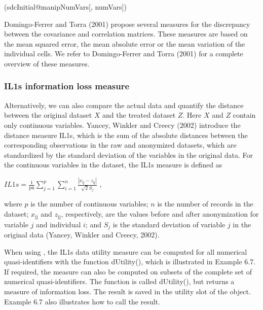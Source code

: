 \documentclass[letterpaper,10pt,english]{sphinxmanual}
\begin{document}
(sdcInitial@manipNumVars{[}, numVars{]})

\begin{DUlineblock}{0em}
\item[] 
\item[] 
\item[] 
\item[] 
\end{DUlineblock}

Domingo-Ferrer and Torra (2001) propose several measures for the
discrepancy between the covariance and correlation matrices. These
measures are based on the mean squared error, the mean absolute error or
the mean variation of the individual cells. We refer to Domingo-Ferrer
and Torra (2001) for a complete overview of these measures.


\subsubsection{IL1s information loss measure}
\label{\detokenize{utility:il1s-information-loss-measure}}
Alternatively, we can also compare the actual data and quantify the
distance between the original dataset \(X\) and the treated dataset
\(Z\). Here \(X\) and \(Z\) contain only continuous
variables. Yancey, Winkler and Creecy (2002) introduce the distance
measure IL1s, which is the sum of the absolute distances between the
corresponding observations in the raw and anonymized datasets, which are
standardized by the standard deviation of the variables in the original
data. For the continuous variables in the dataset, the IL1s measure is
defined as

\(IL1s = \frac{1}{\text{pn}}\sum_{j = 1}^{p}{\sum_{i = 1}^{n}\frac{\left| x_{\text{ij}} - z_{\text{ij}} \right|}{\sqrt{2}S_{j}}}\)
,

where \(p\) is the number of continuous variables; \(n\) is the
number of records in the dataset; \(x_{\text{ij}}\) and
\(z_{\text{ij}}\), respectively, are the values before and after
anonymization for variable \(j\) and individual \(i\); and
\(S_{j}\) is the standard deviation of variable \(j\) in the
original data (Yancey, Winkler and Creecy, 2002).

When using , the IL1s data utility measure can be computed for
all numerical quasi-identifiers with the function dUtility(), which is
illustrated in Example 6.7. If required, the measure can also be
computed on subsets of the complete set of numerical quasi-identifiers.
The function is called dUtility(), but returns a measure of information
loss. The result is saved in the utility slot of the  object.
Example 6.7 also illustrates how to call the result.
\end{document}
